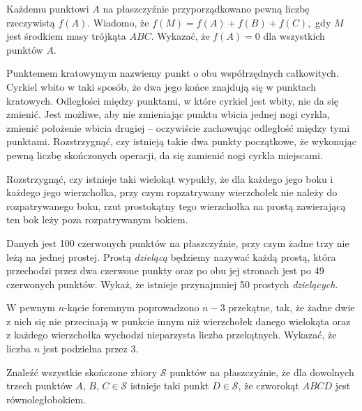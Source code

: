 \begin{problem}{1}
	Każdemu punktowi $A$ na płaszczyźnie przyporządkowano pewną liczbę rzeczywistą $f(A).$ Wiadomo, że $f(M)=f(A)+f(B)+f(C),$ gdy $M$ jest środkiem masy trójkąta $ABC.$ Wykazać, że $f(A)=0$ dla wszystkich punktów $A.$
\end{problem}

\begin{problem}{2}
	Punktemem kratowymym nazwiemy punkt o obu współrzędnych całkowitych. Cyrkiel wbito w taki sposób, że dwa jego końce znajdują się w punktach kratowych. Odległości między punktami, w które cyrkiel jest wbity, nie da się zmienić. Jest możliwe, aby nie zmieniając punktu wbicia jednej nogi cyrkla, zmienić położenie wbicia drugiej -- oczywiście zachowując odległość między tymi punktami. Rozstrzygnąć, czy istnieją takie dwa punkty początkowe, że wykonując pewną liczbę skończonych operacji, da się zamienić nogi cyrkla miejscami.
\end{problem}

\begin{problem}{3}
	Rozstrzygnąć, czy istnieje taki wielokąt wypukły, że dla każdego jego boku i każdego jego wierzchołka, przy czym ropzatrywany wierzchołek nie należy do rozpatrywanego boku, rzut prostokątny tego wierzchołka na prostą zawierającą ten bok leży poza rozpatrywanym bokiem.
\end{problem}

\begin{problem}{4}
	Danych jest 100 czerwonych punktów na płaszczyźnie, przy czym żadne trzy nie leżą na jednej prostej. Prostą \textit{dzielącą} będziemy nazywać każdą prostą, która przechodzi przez dwa czerwone punkty oraz po obu jej stronach jest po 49 czerwonych punktów. Wykaż, że istnieje przynajmniej 50 prostych \textit{dzielących}.
\end{problem}

 
\begin{problem}{5}
	W pewnym $n$-kącie foremnym poprowadzono $n - 3$ przekątne, tak, że żadne dwie z nich się nie przecinają w punkcie innym niż wierzchołek danego wielokąta oraz z każdego wierzchołka wychodzi nieparzysta liczba przekątnych. Wykazać, że liczba $n$ jest podzielna przez $3$.
\end{problem}


\begin{problem}{6}
	Znaleźć wszystkie skończone zbiory $\mathcal{S}$ punktów na płaszczyźnie, że dla dowolnych trzech punktów $A$, $B$, $C \in \mathcal{S}$ istnieje taki punkt $D \in \mathcal{S}$, że czworokąt $ABCD$ jest równoległobokiem.
\end{problem}